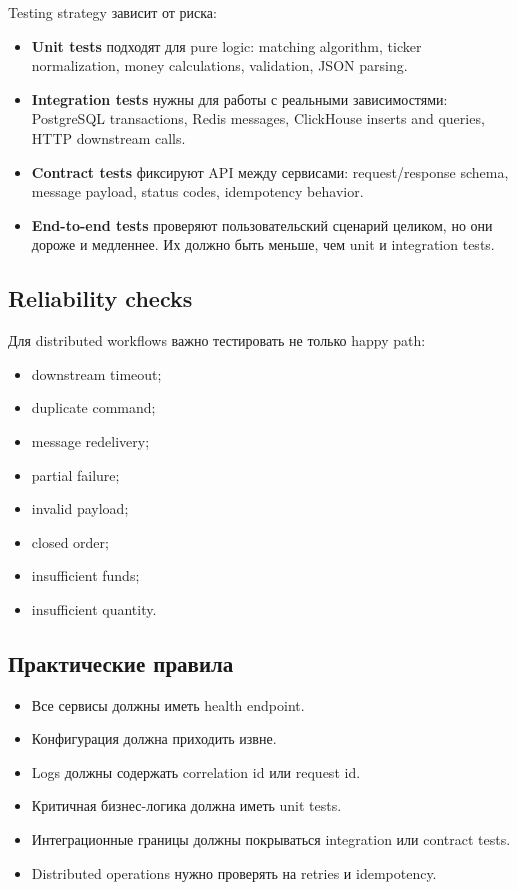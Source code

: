 \documentclass[12pt,a4paper]{article}
\begin{document}
Testing strategy зависит от риска:
\begin{itemize}
    \item \textbf{Unit tests} подходят для pure logic: matching algorithm, ticker
          normalization, money calculations, validation, JSON parsing.
    \item \textbf{Integration tests} нужны для работы с реальными зависимостями:
          PostgreSQL transactions, Redis messages, ClickHouse inserts and queries,
          HTTP downstream calls.
    \item \textbf{Contract tests} фиксируют API между сервисами: request/response
          schema, message payload, status codes, idempotency behavior.
    \item \textbf{End-to-end tests} проверяют пользовательский сценарий целиком,
          но они дороже и медленнее. Их должно быть меньше, чем unit и
          integration tests.
\end{itemize}

\subsection{Reliability checks}

Для distributed workflows важно тестировать не только happy path:
\begin{itemize}
    \item downstream timeout;
    \item duplicate command;
    \item message redelivery;
    \item partial failure;
    \item invalid payload;
    \item closed order;
    \item insufficient funds;
    \item insufficient quantity.
\end{itemize}

\subsection{Практические правила}

\begin{itemize}
    \item Все сервисы должны иметь health endpoint.
    \item Конфигурация должна приходить извне.
    \item Logs должны содержать correlation id или request id.
    \item Критичная бизнес-логика должна иметь unit tests.
    \item Интеграционные границы должны покрываться integration или contract tests.
    \item Distributed operations нужно проверять на retries и idempotency.
\end{itemize}
\end{document}
